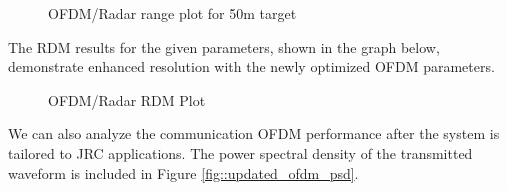 \documentclass[conference]{IEEEtran}
\begin{document}
\begin{figure}[H]
\centering
{}
\caption{OFDM/Radar range plot for 50m target}
\end{figure} 
The RDM results for the given parameters, shown in the graph below, demonstrate enhanced resolution with the newly optimized OFDM parameters.
\begin{figure}[H]
\centering
{}
\caption{OFDM/Radar RDM Plot}
\end{figure} 
\fi

We can also analyze the communication OFDM performance after the system is tailored to JRC applications. The power spectral density of the transmitted waveform is included in Figure \ref{fig::updated_ofdm_psd}.
\end{document}
